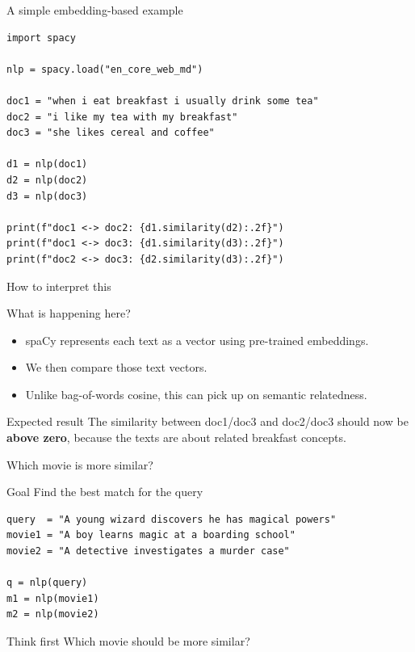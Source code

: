 \documentclass[compress]{beamer}
\begin{document}
\begin{frame}[fragile]{A simple embedding-based example}
\begin{verbatim}
import spacy

nlp = spacy.load("en_core_web_md")

doc1 = "when i eat breakfast i usually drink some tea"
doc2 = "i like my tea with my breakfast"
doc3 = "she likes cereal and coffee"

d1 = nlp(doc1)
d2 = nlp(doc2)
d3 = nlp(doc3)

print(f"doc1 <-> doc2: {d1.similarity(d2):.2f}")
print(f"doc1 <-> doc3: {d1.similarity(d3):.2f}")
print(f"doc2 <-> doc3: {d2.similarity(d3):.2f}")
\end{verbatim}
\end{frame}

\begin{frame}{How to interpret this}
  \begin{block}{What is happening here?}
    \begin{itemize}[<+>]
      \item spaCy represents each text as a vector using pre-trained embeddings.
      \item We then compare those text vectors.
      \item Unlike bag-of-words cosine, this can pick up on semantic relatedness.
    \end{itemize}
  \end{block}
  \pause
  \begin{exampleblock}{Expected result}
    The similarity between doc1/doc3 and doc2/doc3 should now be \textbf{above zero}, because the texts are about related breakfast concepts.
  \end{exampleblock}
\end{frame}

\begin{frame}[fragile]{Which movie is more similar?}
  \begin{block}{Goal}
    Find the best match for the query
  \end{block}
\begin{verbatim}
query  = "A young wizard discovers he has magical powers"
movie1 = "A boy learns magic at a boarding school"
movie2 = "A detective investigates a murder case"

q = nlp(query)
m1 = nlp(movie1)
m2 = nlp(movie2)
\end{verbatim}
  \pause
  \begin{alertblock}{Think first}
    Which movie should be more similar?
  \end{alertblock}
\end{frame}
\end{document}
